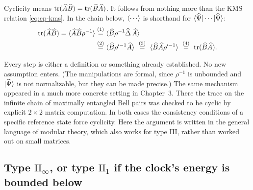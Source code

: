 Cyclicity means $\operatorname{tr}(\widehat A\widehat B)=\operatorname{tr}(\widehat B\widehat A)$. It follows from nothing more than the
KMS relation \eqref{eq:cp-kms}. In the chain below, $\braket{\cdots}$ is shorthand for
$\braket{\widehat\Psi|\cdots|\widehat\Psi}$:
\begin{align}
\operatorname{tr}(\widehat A\widehat B) = \braket{\widehat A\widehat B\rho^{-1}}
&\overset{(1)}{=} \braket{\widehat B\rho^{-1}\widehat\Delta\,\widehat A} \notag\\
&\overset{(2)}{=} \braket{\widehat B\rho'^{-1}\widehat A}
\ \overset{(3)}{=}\ \braket{\widehat B\widehat A\rho'^{-1}}
\ \overset{(4)}{=}\ \operatorname{tr}(\widehat B\widehat A) . \notag
\end{align}
\quad
{}\quad
{}\quad
{}

Every step is either a definition or something already established. No new assumption enters. (The
manipulations are formal, since $\rho^{-1}$ is unbounded and $\ket{\widehat\Psi}$ is not normalizable, but they
can be made precise.) The same mechanism appeared in a much more concrete setting in Chapter~3. There the trace
on the infinite chain of maximally entangled Bell pairs was checked to be cyclic by explicit $2\times2$ matrix
computation. In both cases the consistency conditions of a specific reference state force cyclicity. Here the
argument is written in the general language of modular theory, which also works for type III, rather than
worked out on small matrices.

\subsection*{Type $\mathrm{II}_\infty$, or type $\mathrm{II}_1$ if the clock's energy is bounded below}

